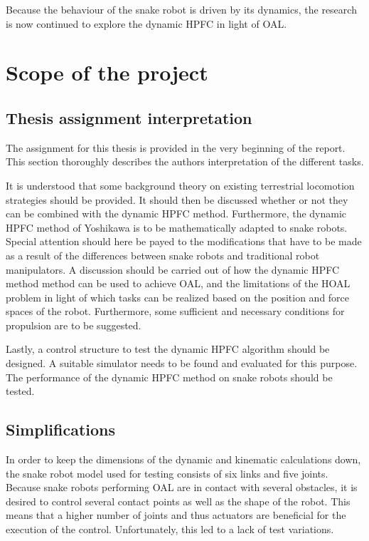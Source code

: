 Because the behaviour of the snake robot is driven by its dynamics, the research is now continued to explore the dynamic HPFC in light of OAL. 


\section{Scope of the project}

\subsection{Thesis assignment interpretation}

The assignment for this thesis is provided in the very beginning of the report. This section thoroughly describes the authors interpretation of the different tasks.

It is understood that some background theory on existing terrestrial locomotion strategies should be provided. It should then be discussed  whether or not they can be combined with the dynamic HPFC method.
Furthermore, the dynamic HPFC method of Yoshikawa \cite{yoshikawa1987dynamic} is to be mathematically adapted to snake robots. Special attention should here be payed to the modifications that have to be made as a result of the differences between snake robots and traditional robot manipulators. A discussion should be carried out of how the dynamic HPFC method method can be used to achieve OAL, and the limitations of the HOAL problem in light of which tasks can be realized based on the position and force spaces of the robot. Furthermore, some sufficient and necessary conditions for propulsion are to be suggested.

Lastly, a control structure to test the dynamic HPFC algorithm should be designed. A suitable simulator needs to be found and evaluated for this purpose. The performance of the dynamic HPFC method on snake robots should be tested.


\subsection{Simplifications}

In order to keep the dimensions of the dynamic and kinematic calculations down, the snake robot model used for testing consists of six links and five joints. Because snake robots performing OAL are in contact with several obstacles, it is desired to control several contact points as well as the shape of the robot. This means that a higher number of joints and thus actuators are beneficial for the execution of the control. Unfortunately, this led to a lack of test variations.


